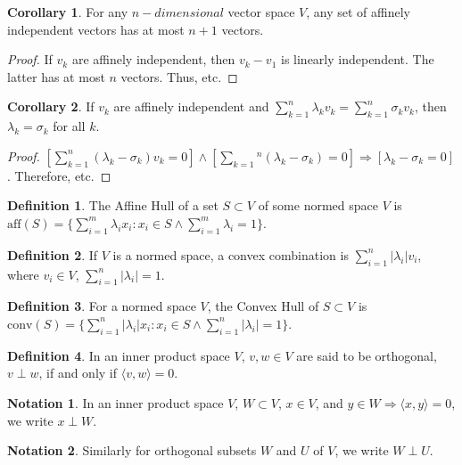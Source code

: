 \documentclass[oneside]{book}
\theoremstyle{definition}
\newtheorem{definition}{Definition}[section]
\newtheorem{corollary}{Corollary}[section]
\newtheorem{notation}{Notation}[section]
\begin{document}
\begin{corollary}
For any $n-dimensional$ vector space $V$, any set of affinely independent vectors has at most $n+1$ vectors.
\end{corollary}
\begin{proof}
If $v_k$ are affinely independent, then $v_k-v_1$ is linearly independent. The latter has at most $n$ vectors. Thus, etc.
\end{proof}

\begin{corollary}
If $v_k$ are affinely independent and $\sum_{k=1}^{n}\lambda_k v_k = \sum_{k=1}^{n} \sigma_k v_k$, then $\lambda_k = \sigma_k$ for all $k$.
\end{corollary}
\begin{proof}
$[\sum_{k=1}^{n}(\lambda_k - \sigma_k)v_k = 0]\land[\sum_{k=1}{^n}(\lambda_k-\sigma_k) = 0]\Rightarrow [\lambda_k-\sigma_k = 0]$. Therefore, etc.
\end{proof}

\begin{definition}
The Affine Hull of a set $S\subset V$ of some normed space $V$ is $\textrm{aff}(S) = \{\sum_{i=1}^{m}\lambda_i x_i: x_i \in S\land \sum_{i=1}^{m}\lambda_i =1\}$.
\end{definition}

\begin{definition}
If $V$ is a normed space, a convex combination is $\sum_{i=1}^{n}|\lambda_i| v_i$, where $v_i\in V$, $\sum_{i=1}^{n}|\lambda_i| = 1$.
\end{definition}

\begin{definition}
For a normed space $V$, the Convex Hull of $S\subset V$ is $\textrm{conv}(S)=\{\sum_{i=1}^{n}|\lambda_i| x_i:x_i\in S\land \sum_{i=1}^{n} |\lambda_i| = 1 \}$.
\end{definition}

\begin{definition}
In an inner product space $V$, $v,w\in V$ are said to be orthogonal, $v\perp w$, if and only if $\langle v,w \rangle = 0$.
\end{definition}

\begin{notation}
In an inner product space $V$, $W\subset V$, $x\in V$, and $y\in W \Rightarrow \langle x,y\rangle = 0$, we write $x\perp W$.
\end{notation}

\begin{notation}
Similarly for orthogonal subsets $W$ and $U$ of $V$, we write $W\perp U$.
\end{notation}
\end{document}
